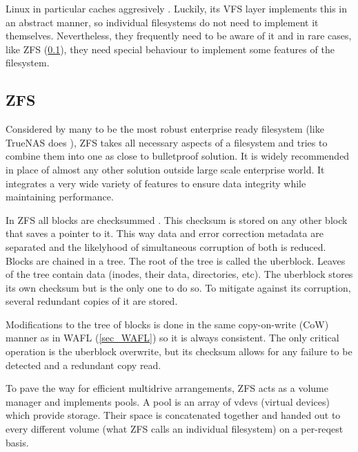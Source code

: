             Linux in particular caches aggresively \cite{Linux_VFS_cache}.
            Luckily, its VFS layer implements this in an abstract manner, so
            individual filesystems do not need to implement it themselves.
            Nevertheless, they frequently need to be aware of it and in rare
            cases, like ZFS (\ref{sec_ZFS}), they need special behaviour to
            implement some features of the filesystem.

        \subsection{ZFS}
            \label{sec_ZFS}

            Considered by many to be the most robust enterprise ready
            filesystem (like TrueNAS does \cite{TrueNAS_enterprise}), ZFS takes
            all necessary aspects of a filesystem and tries to combine them
            into one as close to bulletproof solution. It is widely recommended
            in place of almost any other solution outside large scale
            enterprise world. It integrates a very wide variety of features to
            ensure data integrity while maintaining performance.

            In ZFS all blocks are checksummed \cite{ZFS}. This checksum is
            stored on any other block that saves a pointer to it. This way data
            and error correction metadata are separated and the likelyhood of
            simultaneous corruption of both is reduced. Blocks are chained in a
            tree. The root of the tree is called the uberblock. Leaves of the
            tree contain data (inodes, their data, directories, etc). The
            uberblock stores its own checksum but is the only one to do so. To
            mitigate against its corruption, several redundant copies of it are
            stored.

            Modifications to the tree of blocks is done in the same
            copy-on-write (CoW) manner as in WAFL (\ref{sec_WAFL}) so it is
            always consistent. The only critical operation is the uberblock
            overwrite, but its checksum allows for any failure to be detected
            and a redundant copy read.

            To pave the way for efficient multidrive arrangements, ZFS acts as
            a volume manager and implements pools. A pool is an array of vdevs
            (virtual devices) which provide storage. Their space is
            concatenated together and handed out to every different volume
            (what ZFS calls an individual filesystem) on a per-reqest basis.

